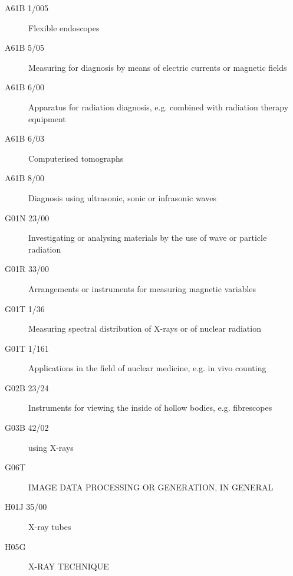 \begin{description}
  \item[A61B 1/005] Flexible endoscopes
  \item[A61B 5/05] Measuring for diagnosis by means of electric currents or magnetic fields
  \item[A61B 6/00] Apparatus for radiation diagnosis, e.g. combined with radiation therapy equipment
  \item[A61B 6/03] Computerised tomographs
  \item[A61B 8/00] Diagnosis using ultrasonic, sonic or infrasonic waves
  \item[G01N 23/00] Investigating or analysing materials by the use of wave or particle radiation
  \item[G01R 33/00] Arrangements or instruments for measuring magnetic variables
  \item[G01T 1/36] Measuring spectral distribution of X-rays or of nuclear radiation
  \item[G01T 1/161] Applications in the field of nuclear medicine, e.g. in vivo counting
  \item[G02B 23/24] Instruments for viewing the inside of hollow bodies, e.g. fibrescopes
  \item[G03B 42/02] using X-rays
  \item[G06T] IMAGE DATA PROCESSING OR GENERATION, IN GENERAL 
  \item[H01J 35/00] X-ray tubes
  \item[H05G] X-RAY TECHNIQUE
\end{description}
